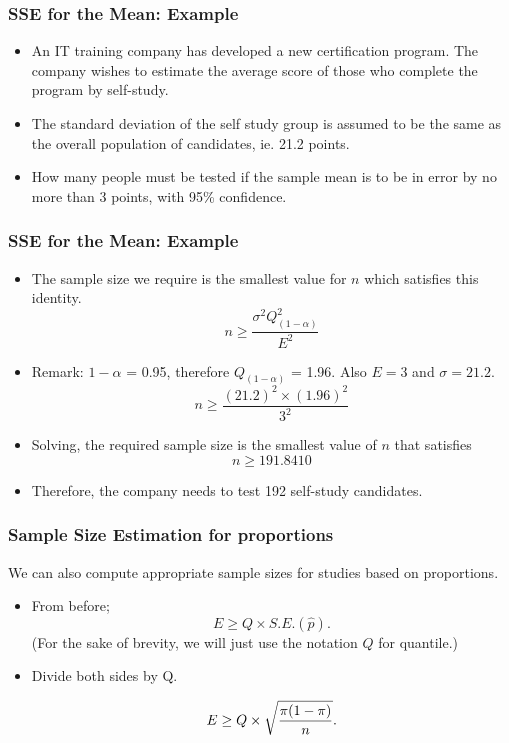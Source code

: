 \begin{frame}
\frametitle{SSE for the Mean: Example}

\begin{itemize}
\item An IT training company has developed a new certification program. The company wishes to estimate the average score of those who complete the program by self-study.  \item The standard deviation of the self study group is assumed to be the same as the overall population of candidates, ie. 21.2 points.
    \item How many people must be tested if the sample mean is to be in error by no more than 3 points, with 95\% confidence.
\end{itemize}
\end{frame}
\begin{frame}
\frametitle{SSE for the Mean: Example}

\begin{itemize}
\item The sample size we require is the smallest value for $n$ which satisfies this identity.
\[ n \geq \frac{\sigma^2 Q^2_{(1-\alpha)}}{E^2}  \]
\item Remark: $1-\alpha$ = 0.95, therefore $Q_{(1-\alpha)}$ = 1.96. Also $E=3$ and $\sigma =21.2$.
\[ n \geq \frac{(21.2)^2 \times (1.96)^2}{3^2} \]
\item Solving, the required sample size is the smallest value of $n$ that satisfies
\[ n \geq 191.8410 \]
\item Therefore, the company needs to test 192 self-study candidates.
\end{itemize}
\end{frame}

\begin{frame}
\frametitle{Sample Size Estimation for proportions}
We can also compute appropriate sample sizes for studies based on proportions.
\begin{itemize}
\item From before; \[ E \geq Q \times S.E.(\hat{p}). \]
(For the sake of brevity, we will just use the notation $Q$ for quantile.)

\item Divide both sides by Q.

\[ E \geq Q \times \sqrt{ {\pi(1-\pi)  \over n} }. \]

\end{itemize}
\end{frame}

